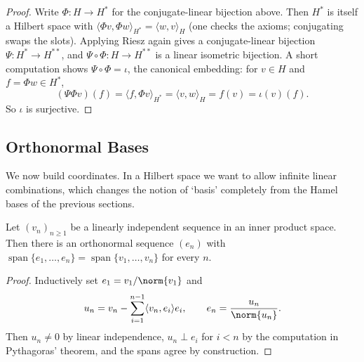 \documentclass[a4paper]{scrartcl}
\newcommand{\ip}[2]{\langle #1, #2 \rangle}
\newcommand{\spn}{\operatorname{span}}
\begin{document}
\begin{proof}
	Write $\Phi : H \to H^*$ for the conjugate-linear bijection above. Then $H^*$ is itself a Hilbert space with $\ip{\Phi v}{\Phi w}_{H^*} = \ip{w}{v}_H$ (one checks the axioms; conjugating swaps the slots). Applying Riesz again gives a conjugate-linear bijection $\Psi : H^* \to H^{**}$, and $\Psi\circ\Phi : H \to H^{**}$ is a linear isometric bijection. A short computation shows $\Psi \circ \Phi = \iota$, the canonical embedding: for $v \in H$ and $f = \Phi w \in H^*$,
	$$(\Psi\Phi v)(f) = \ip{f}{\Phi v}_{H^*} = \ip{v}{w}_H = f(v) = \iota(v)(f).$$
	So $\iota$ is surjective.
\end{proof}

\subsection{Orthonormal Bases}

We now build coordinates. In a Hilbert space we want to allow infinite linear combinations, which changes the notion of `basis' completely from the Hamel bases of the previous sections.

\begin{proposition}
	Let $(v_n)_{n \geq 1}$ be a linearly independent sequence in an inner product space. Then there is an orthonormal sequence $(e_n)$ with $\spn\{e_1,\dots,e_n\} = \spn\{v_1,\dots,v_n\}$ for every $n$.
\end{proposition}

\begin{proof}
	Inductively set $e_1 = v_1/\norm{v_1}$ and
	$$u_n = v_n - \sum_{i=1}^{n-1}\ip{v_n}{e_i}e_i, \qquad e_n = \frac{u_n}{\norm{u_n}}.$$
	Then $u_n \neq 0$ by linear independence, $u_n \perp e_i$ for $i<n$ by the computation in Pythagoras' theorem, and the spans agree by construction.
\end{proof}
\end{document}
